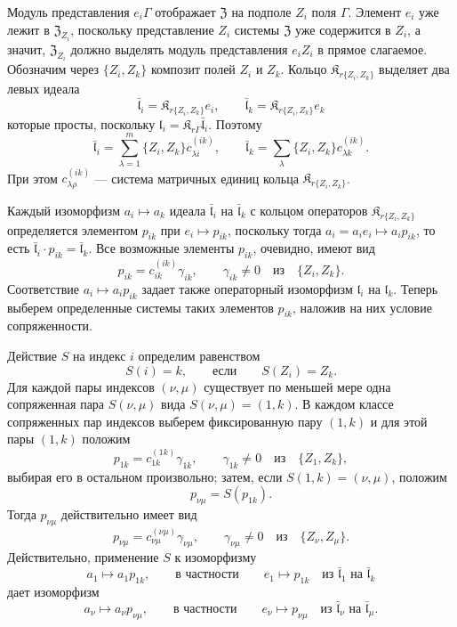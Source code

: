 \documentclass[11pt]{article}
\begin{document}
Модуль представления \(e_i\Gamma\) отображает \(\mathfrak Z\) на подполе \(Z_i\) поля \(\Gamma\). Элемент \(e_i\) уже лежит в \(\mathfrak Z_{Z_i}\), поскольку представление \(Z_i\) системы \(\mathfrak Z\) уже содержится в \(Z_i\), а значит, \(\mathfrak Z_{Z_i}\) должно выделять модуль представления \(e_iZ_i\) в прямое слагаемое. Обозначим через \(\{Z_i,Z_k\}\) композит полей \(Z_i\) и \(Z_k\). Кольцо \(\mathfrak K_{r\{Z_i,Z_k\}}\) выделяет два левых идеала
\[
\bar{\mathfrak l}_i=\mathfrak K_{r\{Z_i,Z_k\}}e_i,\qquad
\bar{\mathfrak l}_k=\mathfrak K_{r\{Z_i,Z_k\}}e_k
\]
которые просты, поскольку \(\mathfrak l_i=\mathfrak K_{r\Gamma}\bar{\mathfrak l}_i\). Поэтому
\[
\bar{\mathfrak l}_i=\sum_{\lambda=1}^m\{Z_i,Z_k\}c_{\lambda i}^{(ik)},\qquad
\bar{\mathfrak l}_k=\sum_{\lambda}\{Z_i,Z_k\}c_{\lambda k}^{(ik)}.
\]
При этом \(c_{\lambda\rho}^{(ik)}\) --- система матричных единиц кольца \(\mathfrak K_{r\{Z_i,Z_k\}}\).

Каждый изоморфизм \(a_i\mapsto a_k\) идеала \(\bar{\mathfrak l}_i\) на \(\bar{\mathfrak l}_k\) с кольцом операторов \(\mathfrak K_{r\{Z_i,Z_k\}}\) определяется элементом \(p_{ik}\) при \(e_i\mapsto p_{ik}\), поскольку тогда \(a_i=a_ie_i\mapsto a_ip_{ik}\), то есть \(\bar{\mathfrak l}_i\cdot p_{ik}=\bar{\mathfrak l}_k\). Все возможные элементы \(p_{ik}\), очевидно, имеют вид
\[
p_{ik}=c_{ik}^{(ik)}\gamma_{ik},\qquad \gamma_{ik}\ne0\quad\text{из}\quad \{Z_i,Z_k\}.
\]
Соответствие \(a_i\mapsto a_ip_{ik}\) задает также операторный изоморфизм \(\mathfrak l_i\) на \(\mathfrak l_k\). Теперь выберем определенные системы таких элементов \(p_{ik}\), наложив на них условие сопряженности.

Действие \(S\) на индекс \(i\) определим равенством
\[
S(i)=k,\qquad\text{если}\qquad S(Z_i)=Z_k.
\]
Для каждой пары индексов \((\nu,\mu)\) существует по меньшей мере одна сопряженная пара \(S(\nu,\mu)\) вида \(S(\nu,\mu)=(1,k)\). В каждом классе сопряженных пар индексов выберем фиксированную пару \((1,k)\) и для этой пары \((1,k)\) положим
\[
p_{1k}=c_{1k}^{(1k)}\gamma_{1k},\qquad \gamma_{1k}\ne0\quad\text{из}\quad \{Z_1,Z_k\},
\]
выбирая его в остальном произвольно; затем, если \(S(1,k)=(\nu,\mu)\), положим
\[
p_{\nu\mu}=S(p_{1k}).
\]
Тогда \(p_{\nu\mu}\) действительно имеет вид
\[
p_{\nu\mu}=c_{\nu\mu}^{(\nu\mu)}\gamma_{\nu\mu},\qquad
\gamma_{\nu\mu}\ne0\quad\text{из}\quad \{Z_\nu,Z_\mu\}.
\]
Действительно, применение \(S\) к изоморфизму
\[
a_1\mapsto a_1p_{1k},\qquad\text{в частности}\qquad e_1\mapsto p_{1k}
\quad\text{из }\bar{\mathfrak l}_1\text{ на }\bar{\mathfrak l}_k
\]
дает изоморфизм
\[
a_\nu\mapsto a_\nu p_{\nu\mu},\qquad\text{в частности}\qquad e_\nu\mapsto p_{\nu\mu}
\quad\text{из }\bar{\mathfrak l}_\nu\text{ на }\bar{\mathfrak l}_\mu.
\]
\end{document}
